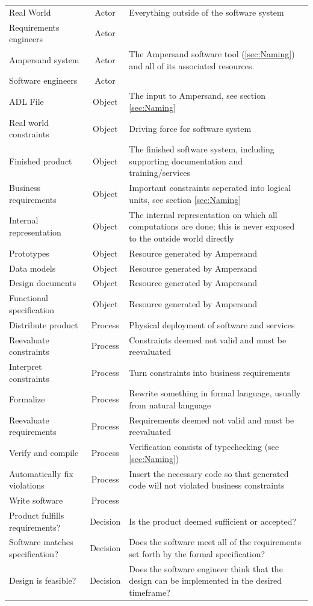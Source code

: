 \documentclass[12pt]{report}
\begin{document}
\begin{tabularx}{1.2\textwidth}{lcX}
Real World & Actor & Everything outside of the software system \\[6pt]
Requirements engineers & Actor & \\[6pt]
Ampersand system & Actor & The Ampersand software tool (\ref{sec:Naming}) and
  all of its associated resources. \\[6pt]
Software engineers & Actor & \\[6pt]
ADL File        & Object        & The input to Ampersand, see section \ref{sec:Naming} \\[6pt] 
Real world constraints  & Object & Driving force for software system \\[6pt] 
Finished product  & Object & The finished software system, including supporting documentation and training/services  \\[6pt] 
Business requirements & Object & Important constraints seperated into logical units, see section \ref{sec:Naming} \\[6pt] 
Internal representation & Object & The internal representation on which all
  computations are done; this is never exposed to the outside world directly \\[6pt]
Prototypes & Object & Resource generated by Ampersand \\[6pt]
Data models & Object & Resource generated by Ampersand \\[6pt]
Design documents & Object & Resource generated by Ampersand \\[6pt]
Functional specification & Object & Resource generated by Ampersand \\[6pt]
Distribute product & Process & Physical deployment of software and services \\[6pt]
Reevaluate constraints & Process & Constraints deemed not valid and must be reevaluated \\[6pt]
Interpret constraints & Process & Turn constraints into business requirements \\[6pt]
Formalize & Process & Rewrite something in formal language, usually from natural language \\[6pt]
Reevaluate requirements & Process & Requirements deemed not valid and must be reevaluated \\[6pt]
Verify and compile & Process & Verification consists of typechecking (see \ref{sec:Naming}) \\[6pt]
Automatically fix violations & Process & Insert the necessary code so that
  generated code will not violated business constraints \\[6pt]
Write software & Process & \\[6pt]
Product  fulfills requirements? & Decision & Is the product deemed sufficient or accepted? \\[6pt]
Software matches specification? & Decision & Does the software meet all of the
  requirements set forth by the formal specification? \\[6pt]
Design is feasible? & Decision & Does the software engineer think that the
  design can be implemented in the desired timeframe? \\[6pt]

\bottomrule 
\end{tabularx}
\end{document}
